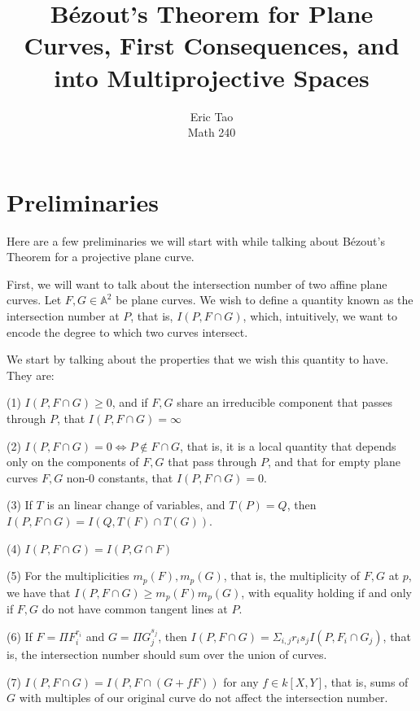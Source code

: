 \documentclass[10pt]{article}
\begin{document}
 
\title{B\'ezout’s Theorem for Plane Curves, First Consequences, and into Multiprojective Spaces}
\author{Eric Tao\\
Math 240}
\maketitle
 
\section{Preliminaries}

Here are a few preliminaries we will start with while talking about B\'ezout’s Theorem for a projective plane curve. 

First, we will want to talk about the intersection number of two affine plane curves. Let $F, G \in \mathbb{A}^2$ be plane curves. We wish to define a quantity known as the intersection number at $P$, that is, $I(P, F \cap G)$, which, intuitively, we want to encode the degree to which two curves intersect.

We start by talking about the properties that we wish this quantity to have. They are:

(1) $I(P, F \cap G) \geq 0$, and if $F, G$ share an irreducible component that passes through $P$, that $I(P, F \cap G) = \infty$

(2) $I(P, F \cap G) = 0 \iff P \not \in F \cap G$, that is, it is a local quantity that depends only on the components of $F,G$ that pass through $P$, and that for empty plane curves $F, G$ non-0 constants, that $I(P, F \cap G) = 0$.

(3) If $T$ is an linear change of variables, and $T(P) = Q$, then $I(P, F \cap G) = I(Q, T(F) \cap T(G))$.

(4) $I(P, F \cap G) = I(P, G \cap F)$

(5) For the multiplicities $m_p(F), m_p(G)$, that is, the multiplicity of $F,G$ at $p$, we have that $I(P, F \cap G) \geq m_p(F)m_p(G)$, with equality holding if and only if $F,G$ do not have common tangent lines at $P$.

(6) If $F = \Pi F_i^{r_i}$ and $G = \Pi G_j^{s_j}$, then $I(P, F \cap G) = \Sigma_{i,j} r_is_j I(P,F_i \cap G_j)$, that is, the intersection number should sum over the union of curves.

(7) $I(P, F \cap G) = I(P, F \cap (G + fF))$ for any $f \in k[X,Y]$, that is, sums of $G$ with multiples of our original curve do not affect the intersection number.
\end{document}
